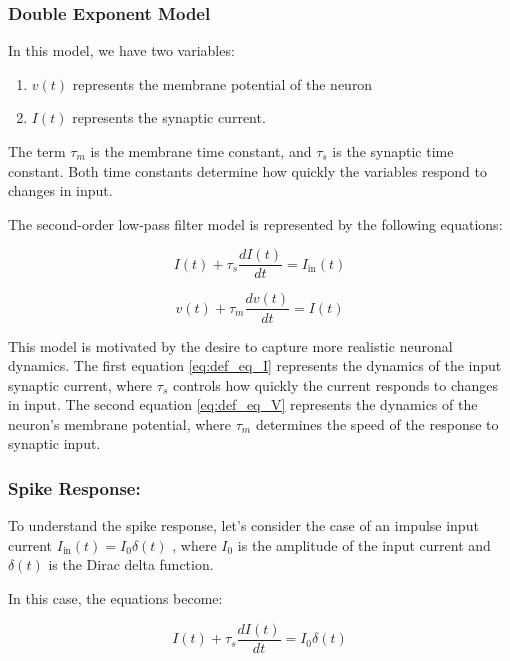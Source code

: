 \subsubsection{Double Exponent Model}

In this model, we have two variables: \\
\begin{enumerate}
    \item $v(t)$ represents the membrane potential of the neuron

    \item $I(t)$ represents the synaptic current.
\end{enumerate}

The term $\tau_m$ is the membrane time constant, and $\tau_s$ is the synaptic time constant. Both time constants determine how quickly the variables respond to changes in input.

The second-order low-pass filter model is represented by the following equations:

\begin{equation} \label{eq:def_eq_I}
    I(t) + \tau_s \frac{dI(t)}{dt} = I_{\text{in}}(t)
\end{equation}

\begin{equation} \label{eq:def_eq_V}
    v(t) + \tau_m \frac{dv(t)}{dt} = I(t)
\end{equation}

This model is motivated by the desire to capture more realistic neuronal dynamics. The first equation \ref{eq:def_eq_I} represents the dynamics of the input synaptic current, where $\tau_s$ controls how quickly the current responds to changes in input. The second equation \ref{eq:def_eq_V} represents the dynamics of the neuron's membrane potential, where $\tau_m$ determines the speed of the response to synaptic input.

\subsubsection*{Spike Response:}

To understand the spike response, let's consider the case of an impulse input current $I_{\text{in}}(t) = I_0 \delta(t)$ , where $I_0$ is the amplitude of the input current and $\delta(t)$ is the Dirac delta function.

In this case, the equations become:

\begin{equation} \label{eq:I_spike_res}
    I(t) + \tau_s \frac{dI(t)}{dt} = I_0 \delta(t)
\end{equation}

